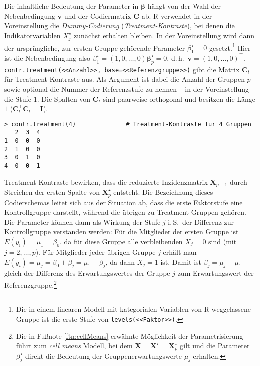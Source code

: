 Die inhaltliche Bedeutung der Parameter in $\bm{\beta}$ hängt von der Wahl der Nebenbedingung $\bm{v}$ und der Codiermatrix $\bm{C}$ ab. R verwendet in der Voreinstellung die \emph{Dummy-Codierung} (\emph{Treatment-Kontraste}), bei denen die Indikatorvariablen $X_{j}^{\star}$ zunächst erhalten bleiben. In der Voreinstellung wird dann der ursprüngliche, zur ersten Gruppe gehörende Parameter $\beta_{1}^{\star} = 0$ gesetzt.\footnote{Die in einem linearen Modell mit kategorialen Variablen von R weggelassene Gruppe ist die erste Stufe von \lstinline!levels(<<Faktor>>)!.} Hier ist die Nebenbedingung also $\beta_{1}^{\star} = (1, 0, \ldots, 0) \bm{\beta}_{p}^{\star} = 0$, d.\,h.\ $\bm{v} = (1, 0, \ldots, 0)^{\top}$. \lstinline!contr.treatment(<<Anzahl>>, base=<<Referenzgruppe>>)! gibt die Matrix $\bm{C}_{t}$ für Treatment-Kontraste aus. Als Argument ist dabei die Anzahl der Gruppen $p$ sowie optional die Nummer der Referenzstufe zu nennen -- in der Voreinstellung die Stufe $1$. Die Spalten von $\bm{C}_{t}$ sind paarweise orthogonal und besitzen die Länge $1$ ($\bm{C}_{t}^{\top} \bm{C}_{t} = \bm{I}$).
\begin{lstlisting}
> contr.treatment(4)              # Treatment-Kontraste für 4 Gruppen
   2  3  4
1  0  0  0
2  1  0  0
3  0  1  0
4  0  0  1
\end{lstlisting}

Treatment-Kontraste bewirken, dass die reduzierte Inzidenzmatrix $\bm{X}_{p-1}$ durch Streichen der ersten Spalte von $\bm{X}_{p}^{\star}$ entsteht. Die Bezeichnung dieses Codierschemas leitet sich aus der Situation ab, dass die erste Faktorstufe eine Kontrollgruppe darstellt, während die übrigen zu Treatment-Gruppen gehören. Die Parameter können dann als Wirkung der Stufe $j$ i.\,S.\ der Differenz zur Kontrollgruppe verstanden werden: Für die Mitglieder der ersten Gruppe ist $E(y_{i}) = \mu_{1} = \beta_{0}$, da für diese Gruppe alle verbleibenden $X_{j} = 0$ sind (mit $j = 2, \ldots, p$). Für Mitglieder jeder übrigen Gruppe $j$ erhält man $E(y_{i}) = \mu_{j} = \beta_{0} + \beta_{j} = \mu_{1} + \beta_{j}$, da dann $X_{j} = 1$ ist. Damit ist $\beta_{j} = \mu_{j} - \mu_{1}$ gleich der Differenz des Erwartungswertes der Gruppe $j$ zum Erwartungswert der Referenzgruppe.\footnote{\label{ftn:cellMeansModel}Die in Fußnote \ref{ftn:cellMeans} erwähnte Möglichkeit der Parametrisierung führt zum \emph{cell means} Modell, bei dem $\bm{X} = \bm{X}^{\star} = \bm{X}_{p}^{\star}$ gilt und die Parameter $\beta_{j}^{\star}$ direkt die Bedeutung der Gruppenerwartungswerte $\mu_{j}$ erhalten.}

